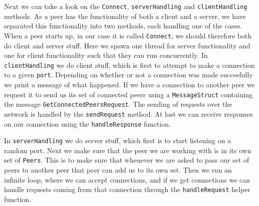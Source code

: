 \documentclass[
  paper=a4,
  ,captions=tableheading
]{scrartcl}
\newcommand{\passthrough}[1]{#1}
\begin{document}
Next we can take a look on the \passthrough{\lstinline!Connect!},
\passthrough{\lstinline!serverHandling!} and
\passthrough{\lstinline!clientHandling!} methods. As a peer has the
functionality of both a client and a server, we have separated this
functionality into two methods, each handling one of the cases. When a
peer starts up, in our case it is called
\passthrough{\lstinline!Connect!}, we should therefore both do client
and server stuff. Here we spawn one thread for server functionality and
one for client functionality such that they can run concurrently. In
\passthrough{\lstinline!clientHandling!} we do client stuff, which is
first to attempt to make a connection to a given
\passthrough{\lstinline!port!}. Depending on whether or not a connection
was made succesfully we print a message of what happened. If we have a
connection to another peer we request it to send us its set of connected
peers using a \passthrough{\lstinline!MessageStruct!} containing the
message \passthrough{\lstinline!GetConnectedPeersRequest!}. The sending
of requests over the network is handled by the
\passthrough{\lstinline!sendRequest!} method. At last we can receive
responses on our connection using the
\passthrough{\lstinline!handleResponse!} function.

In \passthrough{\lstinline!serverHandling!} we do server stuff, which
first is to start listening on a random port. Next we make sure that the
peer we are working with is in its own set of
\passthrough{\lstinline!Peers!}. This is to make sure that whenever we
are asked to pass our set of peers to another peer that peer can add us
to its own set. Then we run an infinite loop, where we can accept
connections, and if we get connections we can handle requests coming
from that connection through the \passthrough{\lstinline!handleRequest!}
helper function.
\end{document}

